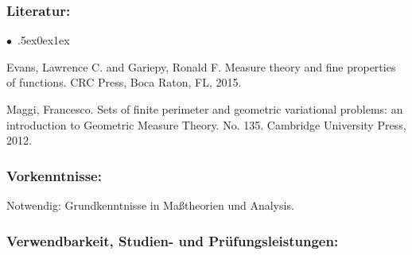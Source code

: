 \documentclass[a4paper,10pt]{article}
\renewenvironment{itemize}{\begin{list}{$\bullet$\ }{\itemsep.5ex\setlength{\topsep}{0.5\itemsep}\parsep0ex\labelsep1ex\settowidth{\labelwidth}{$\bullet$\ }\setlength{\leftmargin}{\labelwidth}\addtolength{\leftmargin}{3ex}\addtolength{\leftmargin}{\labelsep}}}{\end{list}}
\begin{document}
\subsubsection*{\large
    Literatur:
}
\begin{itemize}
\item
  Evans, Lawrence C. and Gariepy, Ronald F. Measure theory and fine properties of functions.
CRC Press, Boca Raton, FL, 2015.
\item Maggi, Francesco. Sets of finite perimeter and geometric variational problems: an introduction
to Geometric Measure Theory. No. 135. Cambridge University Press, 2012.
\end{itemize}
\subsubsection*{\large
    Vorkenntnisse:
}
Notwendig: Grundkenntnisse in Maßtheorien und Analysis.
\cleardoublepage
\subsubsection*{\large
    Verwendbarkeit, Studien- und Prüfungsleistungen:
}
\end{document}
